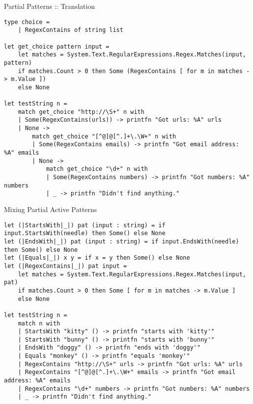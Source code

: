 \documentclass{beamer}
\begin{document}
\begin{frame}[fragile]{Partial Patterns :: Translation}
  \tiny
  \begin{verbatim}
type choice =
    | RegexContains of string list

let get_choice pattern input =
    let matches = System.Text.RegularExpressions.Regex.Matches(input, pattern)
    if matches.Count > 0 then Some (RegexContains [ for m in matches -> m.Value ])
    else None

let testString n =
    match get_choice "http://\S+" n with
    | Some(RegexContains(urls)) -> printfn "Got urls: %A" urls
    | None ->
        match get_choice "[^@]@[^.]+\.\W+" n with
        | Some(RegexContains emails) -> printfn "Got email address: %A" emails
        | None ->
            match get_choice "\d+" n with
            | Some(RegexContains numbers) -> printfn "Got numbers: %A" numbers
            | _ -> printfn "Didn't find anything."
  \end{verbatim}
\end{frame}

\begin{frame}[fragile]{Mixing Partial Active Patterns}
  \tiny
  \begin{verbatim}
let (|StartsWith|_|) pat (input : string) = if input.StartsWith(needle) then Some() else None
let (|EndsWith|_|) pat (input : string) = if input.EndsWith(needle) then Some() else None
let (|Equals|_|) x y = if x = y then Some() else None
let (|RegexContains|_|) pat input =
    let matches = System.Text.RegularExpressions.Regex.Matches(input, pat)
    if matches.Count > 0 then Some [ for m in matches -> m.Value ]
    else None

let testString n =
    match n with
    | StartsWith "kitty" () -> printfn "starts with 'kitty'"
    | StartsWith "bunny" () -> printfn "starts with 'bunny'"
    | EndsWith "doggy" () -> printfn "ends with 'doggy'"
    | Equals "monkey" () -> printfn "equals 'monkey'"
    | RegexContains "http://\S+" urls -> printfn "Got urls: %A" urls
    | RegexContains "[^@]@[^.]+\.\W+" emails -> printfn "Got email address: %A" emails
    | RegexContains "\d+" numbers -> printfn "Got numbers: %A" numbers
    | _ -> printfn "Didn't find anything."
  \end{verbatim}
\end{frame}
\end{document}

